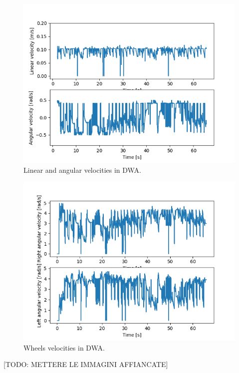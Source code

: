 \documentclass[11pt,a4paper]{article}
\begin{document}
\begin{figure}[H]
    \centering
    \includegraphics[scale=0.4]{dwa_screenshots/Linear_and_Angular_Velocities.png}
    \caption{Linear and angular velocities in DWA.}
\end{figure}

\begin{figure}[H]
    \centering
    \includegraphics[scale=0.4]{dwa_screenshots/Wheels_Velocities.png}
    \caption{Wheels velocities in DWA.}
\end{figure}

[TODO: METTERE LE IMMAGINI AFFIANCATE]
\end{document}
